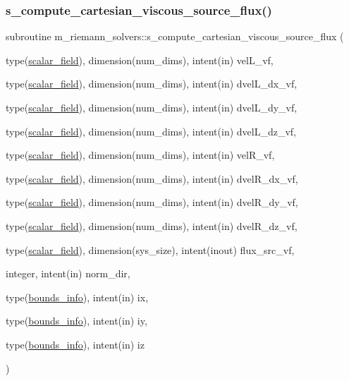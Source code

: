 \subsubsection{\texorpdfstring{s\+\_\+compute\+\_\+cartesian\+\_\+viscous\+\_\+source\+\_\+flux()}{s\_compute\_cartesian\_viscous\_source\_flux()}}
{\footnotesize\ttfamily subroutine m\+\_\+riemann\+\_\+solvers\+::s\+\_\+compute\+\_\+cartesian\+\_\+viscous\+\_\+source\+\_\+flux (\begin{DoxyParamCaption}\item[{type(\hyperlink{structm__derived__types_1_1scalar__field}{scalar\+\_\+field}), dimension(num\+\_\+dims), intent(in)}]{vel\+L\+\_\+vf,  }\item[{type(\hyperlink{structm__derived__types_1_1scalar__field}{scalar\+\_\+field}), dimension(num\+\_\+dims), intent(in)}]{dvel\+L\+\_\+dx\+\_\+vf,  }\item[{type(\hyperlink{structm__derived__types_1_1scalar__field}{scalar\+\_\+field}), dimension(num\+\_\+dims), intent(in)}]{dvel\+L\+\_\+dy\+\_\+vf,  }\item[{type(\hyperlink{structm__derived__types_1_1scalar__field}{scalar\+\_\+field}), dimension(num\+\_\+dims), intent(in)}]{dvel\+L\+\_\+dz\+\_\+vf,  }\item[{type(\hyperlink{structm__derived__types_1_1scalar__field}{scalar\+\_\+field}), dimension(num\+\_\+dims), intent(in)}]{vel\+R\+\_\+vf,  }\item[{type(\hyperlink{structm__derived__types_1_1scalar__field}{scalar\+\_\+field}), dimension(num\+\_\+dims), intent(in)}]{dvel\+R\+\_\+dx\+\_\+vf,  }\item[{type(\hyperlink{structm__derived__types_1_1scalar__field}{scalar\+\_\+field}), dimension(num\+\_\+dims), intent(in)}]{dvel\+R\+\_\+dy\+\_\+vf,  }\item[{type(\hyperlink{structm__derived__types_1_1scalar__field}{scalar\+\_\+field}), dimension(num\+\_\+dims), intent(in)}]{dvel\+R\+\_\+dz\+\_\+vf,  }\item[{type(\hyperlink{structm__derived__types_1_1scalar__field}{scalar\+\_\+field}), dimension(sys\+\_\+size), intent(inout)}]{flux\+\_\+src\+\_\+vf,  }\item[{integer, intent(in)}]{norm\+\_\+dir,  }\item[{type(\hyperlink{structm__derived__types_1_1bounds__info}{bounds\+\_\+info}), intent(in)}]{ix,  }\item[{type(\hyperlink{structm__derived__types_1_1bounds__info}{bounds\+\_\+info}), intent(in)}]{iy,  }\item[{type(\hyperlink{structm__derived__types_1_1bounds__info}{bounds\+\_\+info}), intent(in)}]{iz }\end{DoxyParamCaption})}



